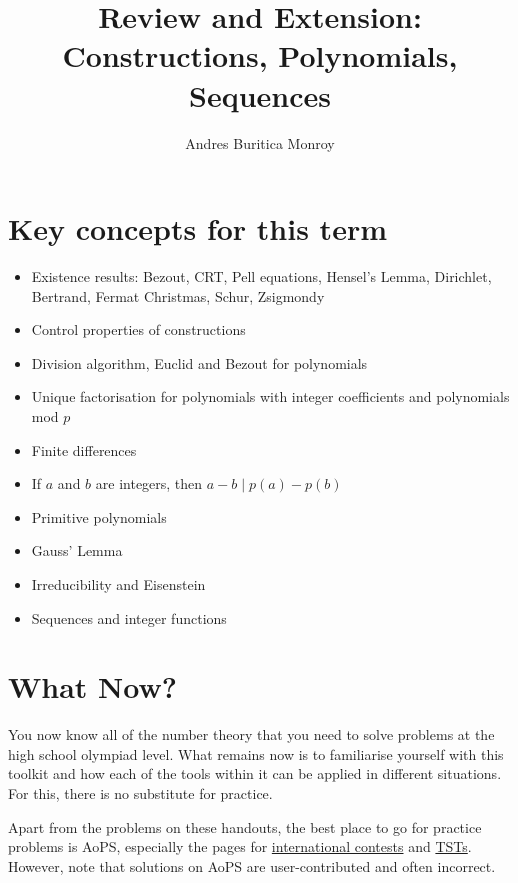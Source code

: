 \documentclass{article}
\title{Review and Extension: Constructions, Polynomials, Sequences}
\author{Andres Buritica Monroy}
\date{}
\begin{document}
\maketitle
\section{Key concepts for this term}
\begin{itemize}
	\item Existence results: Bezout, CRT, Pell equations, Hensel's
	      Lemma, Dirichlet, Bertrand, Fermat Christmas, Schur, Zsigmondy
	\item Control properties of constructions
	\item Division algorithm, Euclid and Bezout for polynomials
	\item Unique factorisation for polynomials with integer coefficients and
	      polynomials mod $p$
	\item Finite differences
	\item If $a$ and $b$ are integers, then $a-b\mid p(a)-p(b)$
	\item Primitive polynomials
	\item Gauss' Lemma
	\item Irreducibility and Eisenstein
	\item Sequences and integer functions
\end{itemize}
\section{What Now?}
You now know all of the number theory that you need to solve problems
at the high school olympiad level. What remains now
is to familiarise yourself with this toolkit and how each of the tools within it
can be applied in different situations. For this, there is no substitute for
practice.

Apart from the problems on these handouts, the best place to go for
practice problems is AoPS, especially
the pages for \href{https://artofproblemsolving.com/community/c14}{international
	contests} and \href{https://artofproblemsolving.com/community/c59}{TSTs}.
However, note that solutions on AoPS are user-contributed and often incorrect.
\end{document}
